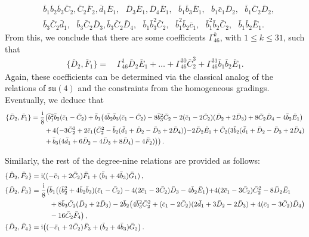 \documentclass[10pt]{amsart}
\theoremstyle{definition}
\theoremstyle{corollary}
\theoremstyle{remark}
\theoremstyle{conclusion}
\begin{document}
\begin{align*}
   & \,\bar{b}_1 \bar{b}_2  \bar{b}_3 \bar{C}_2,\bar{C}_2 \bar{F}_2,\bar{d}_1 \bar{E}_1,\text{ } \bar{D}_3 \bar{E}_1,\bar{D}_4 \bar{E}_1,\text{ } \bar{b}_1 \bar{b}_3 \bar{E}_1,\text{ } \bar{b}_1 \bar{c}_1 \bar{D}_2,\text{ } \bar{b}_1 \bar{C}_2 \bar{D}_2,\\
   & \,\bar{b}_3 \bar{C}_2 \bar{d}_1,\text{ } \bar{b}_3 \bar{C}_2 \bar{D}_3,\bar{b}_3 \bar{C}_2 \bar{D}_4,\text{ } \bar{b}_1 \bar{b}_3^2 \bar{C}_2,\text{ } \bar{b}_1^2 \bar{b}_2 \bar{c}_1,\text{ } \bar{b}_1^2 \bar{b}_2 \bar{C}_2,\text{ } \bar{b}_1 \bar{b}_2 \bar{E}_1.
\end{align*}  From this, we conclude that there are some coefficients $\Gamma_{46}^k$, with $1 \leq k \leq 31$, such that  \begin{align*}
    \{\bar{D}_2, \bar{F}_1\} = & \,\Gamma_{46}^1 \bar{D}_2\bar{E}_1  +   \ldots+ \Gamma_{46}^{30} \bar{C}_2^3   + \Gamma_{46}^{31} \bar{b}_1\bar{b}_2\bar{E}_1 .
\end{align*} Again, these coefficients can be determined via  the classical analog of the relations of $\mathfrak{su}(4)$ and the constraints from the homogeneous gradings. Eventually, we deduce that \begin{align}
    \{\bar{D}_2, \bar{F}_1\}&= \frac{{\rm i}}{8}\bigl( \bar{b}_1^2 \bar{b}_2(\bar{c}_1-\bar{C}_2) +\bar{b}_1\bigl(4 \bar{b}_2 \bar{b}_3(\bar{c}_1-\bar{C}_2)-8 \bar{b}_3^2 \bar{C}_2-2(\bar{c}_1-2\bar{C}_2)(\bar{D}_2+2\bar{D}_3)+8 \bar{C}_2 \bar{D}_4-4 \bar{b}_2 \bar{E}_1\bigl)\nonumber\\
& \hskip 0.7cm+4\bigl(-3\bar{C}_2^3+  2\bar{c}_1\bigl(\bar{C}_2^2-\bar{b}_2(\bar{d}_1+\bar{D}_2-\bar{D}_3+2\bar{D}_4)\bigl) -2 \bar{D}_2 \bar{E}_1+ \bar{C}_2(3 \bar{b}_2(\bar{d}_1 +\bar{D}_2-\bar{D}_3+2\bar{D}_4)\nonumber\\
& \hskip 0.7cm +\bar{b}_3(4\bar{d}_1+6 \bar{D}_2-4 \bar{D}_3+8 \bar{D}_4) -4 \bar{F}_2)\bigl)\bigl) \, .
\end{align} 

Similarly, the rest of the degree-nine relations are provided as follows:  %
\begin{align}  
\{\bar{D}_2, \bar{F}_2\}&={\rm i}((-\bar{c}_1+2\bar{C}_2)\bar{F}_1+(\bar{b}_1+4 \bar{b}_3)\bar{G}_1) \, , \nonumber\\
\{\bar{D}_2, \bar{F}_3\}&=\frac{{\rm i}}{8}\bigl(\bar{b}_1\bigl((\bar{b}_2^2+4 \bar{b}_2\bar{b}_3)(\bar{c}_1-\bar{C}_2) -4(2\bar{c}_1-3 \bar{C}_2)\bar{D}_3-4 \bar{b}_2 \bar{E}_1\bigl)+4(2\bar{c}_1-3\bar{C}_2)\bar{C}_2^2-8\bar{D}_2 \bar{E}_1 \nonumber\\
&\hskip 0.9 cm +8 \bar{b}_3 \bar{C}_2(\bar{D}_2+2\bar{D}_3)-2 \bar{b}_2 \bigl(4 \bar{b}_3^2 \bar{C}_2^2+(\bar{c}_1-2\bar{C}_2)(2\bar{d}_1+3\bar{D}_2-2\bar{D}_3)+4(\bar{c}_1-3\bar{C}_2)\bar{D}_4\bigl) \nonumber\\
&\hskip 0.9cm -16 \bar{C}_2 \bar{F}_4 
\bigl) \, , \nonumber\\
\{\bar{D}_2, \bar{F}_4\}&={\rm i}\bigl((-\bar{c}_1+2\bar{C}_2)\bar{F}_3+(\bar{b}_2+4\bar{b}_3)\bar{G}_2\bigl) \, .
\end{align} 
\end{document}
